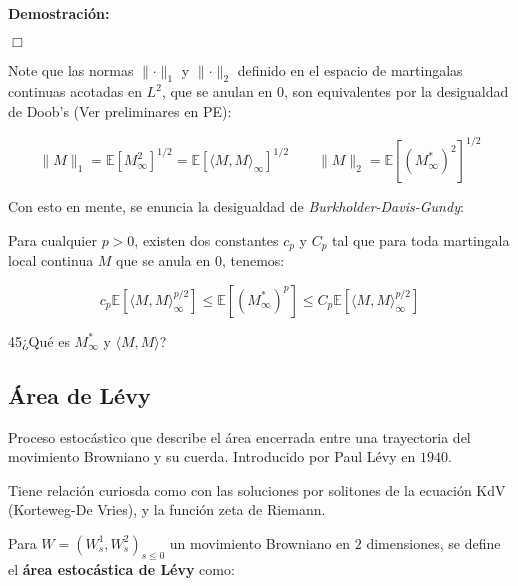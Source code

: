 \textbf{Demostración:}

\begin{flushright}
	$\Box$
\end{flushright}

Note que las normas $\lVert \cdot \rVert_1$ y $\lVert \cdot \rVert_2$ definido en el espacio de martingalas continuas acotadas en $L^2$, que se anulan en $0$, son equivalentes por la desigualdad de Doob's (Ver preliminares en PE):

\[
	\lVert M \rVert_1 = \mathbb{E}[M^2_{\infty}]^{1/2} = \mathbb{E}[ \langle  M, M \rangle_{\infty}]^{1/2} \qquad \lVert M \rVert_2 = \mathbb{E}[ (M^*_{\infty})^2 ]^{1/2}
\]

Con esto en mente, se enuncia la desigualdad de \textit{Burkholder-Davis-Gundy}:

\begin{theorem} 
Para cualquier $p > 0$, existen dos constantes $c_p$ y $C_p$ tal que para toda martingala local continua $M$ que se anula en $0$, tenemos:

\[
	c_p \mathbb{E}[ \langle M,M \rangle_{\infty}^{p/2} ] \leq \mathbb{E}[ (M^*_{\infty})^p ] \leq C_p \mathbb{E}[ \langle M,M \rangle_{\infty}^{p/2} ]
\]

\end{theorem}

45¿Qué es $M^*_{\infty}$ y $\langle M,M \rangle$?





\subsection{Área de Lévy}

Proceso estocástico que describe el área encerrada entre una trayectoria del movimiento Browniano y su cuerda. Introducido por Paul Lévy en $1940$.


Tiene relación curiosda como con las soluciones por solitones de la ecuación KdV (Korteweg-De Vries), y la función zeta de Riemann.

Para $W = (W_s^1, W_s^2)_{s \leq 0}$ un movimiento Browniano en $2$ dimensiones, se define el \textbf{área estocástica de Lévy} como:

